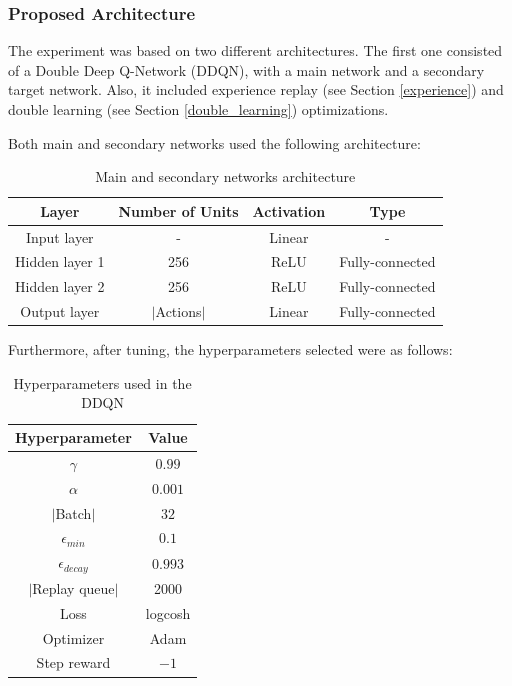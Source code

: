 \documentclass[11pt,twoside]{article}
\begin{document}
\subsubsection{Proposed Architecture}\label{arch}

The experiment was based on two different architectures. The first one consisted of a Double Deep Q-Network (DDQN), with a main network and a secondary target network. Also, it included experience replay (see Section \ref{experience}) and double learning (see Section \ref{double_learning}) optimizations.

Both main and secondary networks used the following architecture:

\begin{table}[H]
	\begin{center}
		\begin{tabular}{|c|c|c|c|} 
			\hline
			Layer & Number of Units & Activation & Type \\
			\hline\hline
			Input layer & - & Linear & - \\ 
			\hline
			Hidden layer 1 & 256 & ReLU & Fully-connected\\
			\hline
			Hidden layer 2 & 256 & ReLU & Fully-connected\\
			\hline
			Output layer & $|$Actions$|$ & Linear & Fully-connected\\
			\hline
		\end{tabular}
		\caption{Main and secondary networks architecture}
	\end{center}
\end{table}

Furthermore, after tuning, the hyperparameters selected were as follows:

\begin{table}[H]
	\begin{center}
		\begin{tabular}{|c |c|} 
			\hline
			Hyperparameter & Value \\
			\hline\hline
			$\gamma$ & $0.99$ \\
			$\alpha$ & $0.001$ \\
			$|$Batch$|$ & $32$ \\
			$\epsilon_{min}$ & $0.1$ \\
			$\epsilon_{decay}$ & $0.993$ \\
			$|$Replay queue$|$ & 2000 \\
			Loss & logcosh \\
			Optimizer & Adam \\
			Step reward & $-1$ \\
			\hline
		\end{tabular}
		\caption{Hyperparameters used in the DDQN}
	\end{center}
\end{table}
\end{document}

